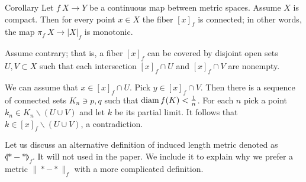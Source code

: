 \documentclass{article}
\begin{document}



\begin{thm}{Corollary}\label{cor:fiberconnected}
Let $f\:X\to Y$ be a continuous map between metric spaces.
Assume $X$ is compact. 
Then for every point $x\in X$ the fiber $[x]_f$ is connected;
in other words, the map $\pi_f\:X\to |X|_f$ is monotonic.
\end{thm}


Assume contrary;
that is, a fiber $[x]_f$ can be covered by disjoint open sets $U,V\subset X$ such that each intersection 
$[x]_f\cap U$ and $[x]_f\cap V$ are nonempty.

We can assume that $x\in [x]_f\cap U$.
Pick $y\in [x]_f\cap V$.
Then there is a sequence of connected sets $K_n\ni p,q$ such that $\mathop{\rm diam}\nolimits f(K)<\tfrac1n$.
For each $n$ pick a point $k_n\in K_n\backslash (U\cup V)$ and let $k$ be its partial limit.
It follows that $k\in [x]_f\backslash (U\cup V)$, a contradiction.
\qeds



Let us discuss an alternative definition of induced length metric denoted as $\llangle {*}-{*}\rrangle_f$.
It will not used in the paper.
We include it to explain why we prefer a metric $\|{*}-{*}\|_f$ with a more complicated definition.
\end{document}
